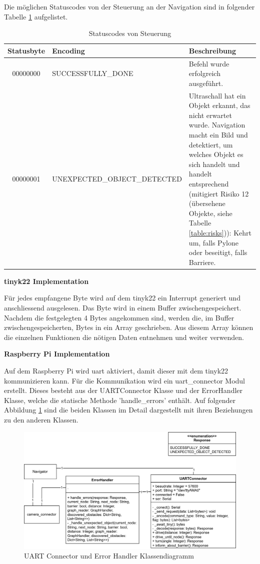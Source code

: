 Die möglichen Statuscodes von der Steuerung an der Navigation sind in folgender Tabelle \ref{table:statuscodes} aufgelistet.

\begin{table}[H]
\centering
\small
\begin{tabularx}{\textwidth}{|c|l|X|}
\hline
  \textbf{Statusbyte} & \textbf{Encoding} & \textbf{Beschreibung} \\
  \hline
      00000000&SUCCESSFULLY\_DONE&Befehl wurde erfolgreich ausgeführt. \\
  \hline
00000001&UNEXPECTED\_OBJECT\_DETECTED &Ultraschall hat ein Objekt erkannt, das nicht erwartet wurde. Navigation macht ein Bild und detektiert, um welches Objekt es sich handelt und handelt entsprechend (mitigiert Risiko 12 (übersehene Objekte, siehe Tabelle \ref{table:risks})): Kehrt um, falls Pylone oder beseitigt, falls Barriere.\\
  \hline
\end{tabularx}
\caption{Statuscodes von Steuerung}
\label{table:statuscodes}
\end{table}

\textbf{\gls{tinyk22} Implementation}

Für jedes empfangene Byte wird auf dem \gls{tinyk22} ein Interrupt generiert und anschliessend ausgelesen. Das Byte wird in einem Buffer zwischengespeichert. Nachdem die festgelegten 4 Bytes angekommen sind, werden die, im Buffer zwischengespeicherten, Bytes in ein Array geschrieben. Aus diesem Array können die einzelnen Funktionen die nötigen Daten entnehmen und weiter verwenden.

\textbf{Raspberry Pi Implementation}
\label{raspi-uart}

Auf dem Raspberry Pi wird \acrshort{uart} aktiviert, damit dieser mit dem \gls{tinyk22} kommunizieren kann.
Für die Kommunikation wird ein uart\_connector Modul erstellt. Dieses besteht aus der UARTConnector Klasse und der ErrorHandler Klasse, welche die statische Methode 'handle\_errors' enthält. Auf folgender Abbildung \ref{fig:uart-connector-nav} sind die beiden Klassen im Detail dargestellt mit ihren Beziehungen zu den anderen Klassen.

\begin{figure}[H]
\centering
\includegraphics[width=\textwidth]{assets/IT/robot-sw-architecture-uart-connector.png}
\caption{UART Connector und Error Handler Klassendiagramm}
\label{fig:uart-connector-nav}
\end{figure}

